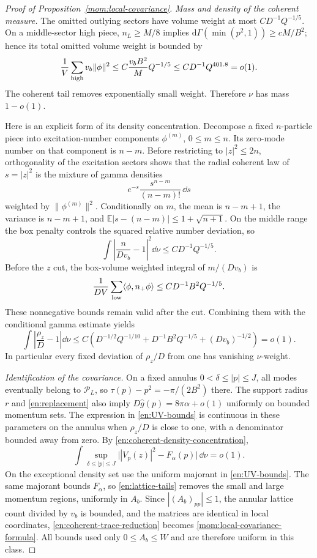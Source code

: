\begin{proof}[Proof of Proposition~\ref{mom:local-covariance}]
\emph{Mass and density of the coherent measure.}
The omitted outlying sectors have volume weight at most
$CD^{-1}Q^{-1/5}$.  On a middle-sector high piece,
$n_L\ge M/8$ implies
$\mathrm d\Gamma(\min(p^2,1))\ge cM/B^2$; hence its total omitted
volume weight is bounded by
\begin{equation}\label{en:high-volume-loss}
 \frac1V\sum_{\rm high}v_b\|\phi\|^2
       \le C\frac{v_bB^2}{M}Q^{-1/5}
       \le CD^{-1}Q^{401.8}=o(1).
\end{equation}
The coherent tail removes exponentially small weight.  Therefore
$\nu$ has mass $1-o(1)$.

Here is an explicit form of its density concentration.  Decompose a
fixed $n$-particle piece into excitation-number components $\phi^{(m)}$,
$0\le m\le n$.  Its zero-mode number on that component is $n-m$.
Before restricting to $|z|^2\le2n$, orthogonality of the excitation
sectors shows that the radial coherent law of $s=|z|^2$ is the
mixture of gamma densities
\[
 e^{-s}\frac{s^{n-m}}{(n-m)!}\,\dd s
\]
weighted by $\|\phi^{(m)}\|^2$.  Conditionally on $m$, the mean is
$n-m+1$, the variance is $n-m+1$, and
$\mathbb E|s-(n-m)|\le1+\sqrt{n+1}$.
On the middle range the box penalty controls the squared relative
number deviation, so
\[
 \int\left|\frac n{Dv_b}-1\right|^2\dd\nu
       \le CD^{-1}Q^{-1/5}.
\]
Before the $z$ cut, the box-volume weighted integral of $m/(Dv_b)$ is
\[
 \frac1{DV}\sum_{\rm low}\langle\phi,n_+\phi\rangle
       \le CD^{-1}B^2Q^{-1/5}.
\]
These nonnegative bounds remain valid after the cut.  Combining them
with the conditional gamma estimate yields
\begin{equation}\label{en:coherent-density-concentration}
 \int\left|\frac{\rho_z}{D}-1\right|\dd\nu
 \le C\left(D^{-1/2}Q^{-1/10}
       +D^{-1}B^2Q^{-1/5}+(Dv_b)^{-1/2}\right)=o(1).
\end{equation}
In particular every fixed deviation of $\rho_z/D$ from one has
vanishing $\nu$-weight.

\emph{Identification of the covariance.}
On a fixed annulus $0<\delta\le|p|\le J$, all modes eventually
belong to $\mathcal P_L$, so $\tau(p)-p^2=-\pi/(2B^2)$ there.
The support radius $r$ and \eqref{en:replacement} also imply
$D\widehat g(p)=8\pi\alpha+o(1)$ uniformly on bounded momentum sets.
The expression in \eqref{en:UV-bounds} is continuous in these
parameters on the annulus when $\rho_z/D$ is close to one, with a
denominator bounded away from zero.  By
\eqref{en:coherent-density-concentration},
\[
 \int\sup_{\delta\le|p|\le J}
       \bigl||V_p(z)|^2-F_\alpha(p)\bigr|\,\dd\nu=o(1).
\]
On the exceptional density set use the uniform majorant in
\eqref{en:UV-bounds}.  The same majorant bounds $F_\alpha$, so
\eqref{en:lattice-tails} removes the small and large momentum regions,
uniformly in $A_b$.  Since $|(A_b)_{pp}|\le1$, the annular lattice
count divided by $v_b$ is bounded, and the matrices are identical in
local coordinates, \eqref{en:coherent-trace-reduction} becomes
\eqref{mom:local-covariance-formula}.  All bounds used only
$0\le A_b\le W$ and are therefore uniform in this class.


\end{proof}
